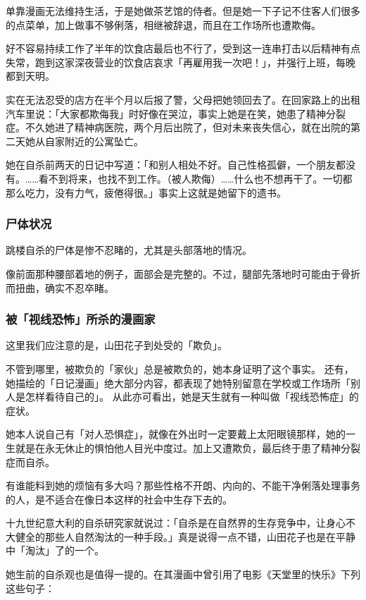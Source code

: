 \documentclass[UTF8]{ctexart}
\begin{document}
单靠漫画无法维持生活，于是她做茶艺馆的侍者。但是她一下子记不住客人们很多的点菜单，加上做事不够俐落，相继被辞退，而且在工作场所也遭欺侮。

好不容易持续工作了半年的饮食店最后也不行了，受到这一连串打击以后精神有点失常，跑到这家深夜营业的饮食店哀求「再雇用我一次吧！」，并强行上班，每晚都到天明。

实在无法忍受的店方在半个月以后报了警，父母把她领回去了。在回家路上的出租汽车里说：「大家都欺侮我」时好像在哭泣，事实上她是在笑，她患了精神分裂症。不久她进了精神病医院，两个月后出院了，但对未来丧失信心，就在出院的第二天她从自家附近的公寓坠亡。

她在自杀前两天的日记中写道：「和别人相处不好。自己性格孤僻，一个朋友都没有。……看不到将来，也找不到工作。（被人欺侮）……什么也不想再干了。一切都那么吃力，没有力气，疲倦得很。」事实上这就是她留下的遗书。

\subsubsection*{尸体状况}

跳楼自杀的尸体是惨不忍睹的，尤其是头部落地的情况。

像前面那种腰部着地的例子，面部会是完整的。不过，腿部先落地时可能由于骨折而扭曲，确实不忍卒睹。

\subsubsection*{被「视线恐怖」所杀的漫画家}

这里我们应注意的是，山田花子到处受的「欺负」。

不管到哪里，被欺负的「家伙」总是被欺负的，她本身证明了这个事实。
还有，她描绘的「日记漫画」绝大部分内容，都表现了她特别留意在学校或工作场所「别人是怎样看待自己的」。
从此亦可看出，她是天生就有一种叫做「视线恐怖症」的症状。

她本人说自己有「对人恐惧症」，就像在外出时一定要戴上太阳眼镜那样，她的一生就是在永无休止的惧怕他人目光中度过。加上又遭欺负，最后终于患了精神分裂症而自杀。

有谁能料到她的烦恼有多大吗？那些性格不开朗、内向的、不能干净俐落处理事务的人，是不适合在像日本这样的社会中生存下去的。

十九世纪意大利的自杀研究家就说过：「自杀是在自然界的生存竞争中，让身心不大健全的那些人自然淘汰的一种手段。」真是说得一点不错，山田花子也是在平静中「淘汰」了的一个。 

她生前的自杀观也是值得一提的。在其漫画中曾引用了电影《天堂里的快乐》下列这些句子：
\end{document}
